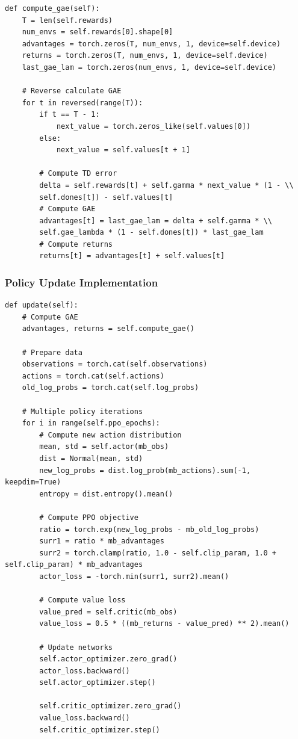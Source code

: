 \documentclass[12pt]{article}
\begin{document}
\begin{verbatim}
def compute_gae(self):
    T = len(self.rewards)
    num_envs = self.rewards[0].shape[0]
    advantages = torch.zeros(T, num_envs, 1, device=self.device)
    returns = torch.zeros(T, num_envs, 1, device=self.device)
    last_gae_lam = torch.zeros(num_envs, 1, device=self.device)
    
    # Reverse calculate GAE
    for t in reversed(range(T)):
        if t == T - 1:
            next_value = torch.zeros_like(self.values[0])
        else:
            next_value = self.values[t + 1]
        
        # Compute TD error
        delta = self.rewards[t] + self.gamma * next_value * (1 - \\
        self.dones[t]) - self.values[t]
        # Compute GAE
        advantages[t] = last_gae_lam = delta + self.gamma * \\
        self.gae_lambda * (1 - self.dones[t]) * last_gae_lam
        # Compute returns
        returns[t] = advantages[t] + self.values[t]
\end{verbatim}

\subsubsection{Policy Update Implementation}

\begin{verbatim}
def update(self):
    # Compute GAE
    advantages, returns = self.compute_gae()
    
    # Prepare data
    observations = torch.cat(self.observations)
    actions = torch.cat(self.actions)
    old_log_probs = torch.cat(self.log_probs)
    
    # Multiple policy iterations
    for i in range(self.ppo_epochs):
        # Compute new action distribution
        mean, std = self.actor(mb_obs)
        dist = Normal(mean, std)
        new_log_probs = dist.log_prob(mb_actions).sum(-1, keepdim=True)
        entropy = dist.entropy().mean()
        
        # Compute PPO objective
        ratio = torch.exp(new_log_probs - mb_old_log_probs)
        surr1 = ratio * mb_advantages
        surr2 = torch.clamp(ratio, 1.0 - self.clip_param, 1.0 + self.clip_param) * mb_advantages
        actor_loss = -torch.min(surr1, surr2).mean()
        
        # Compute value loss
        value_pred = self.critic(mb_obs)
        value_loss = 0.5 * ((mb_returns - value_pred) ** 2).mean()
        
        # Update networks
        self.actor_optimizer.zero_grad()
        actor_loss.backward()
        self.actor_optimizer.step()
        
        self.critic_optimizer.zero_grad()
        value_loss.backward()
        self.critic_optimizer.step()
\end{verbatim}
\end{document}

